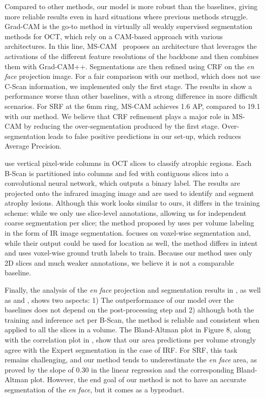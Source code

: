 Compared to other methods, our model is more robust than the baselines, giving more reliable results even in hard situations where previous methods struggle. Grad-CAM is the go-to method in virtually all weakly supervised segmentation methods for OCT, which rely on a CAM-based approach with various architectures. In this line, MS-CAM~ proposes an architecture that leverages the activations of the different feature resolutions of the backbone and then combines them with Grad-CAM++. Segmentations are then refined using CRF on the \textit{en face} projection image. For a fair comparison with our method, which does not use C-Scan information, we implemented only the first stage. The results in  show a performance worse than other baselines, with a strong difference in more difficult scenarios. For SRF at the 6mm ring, MS-CAM achieves 1.6 AP, compared to 19.1 with our method. We believe that CRF refinement plays a major role in MS-CAM by reducing the over-segmentation produced by the first stage. Over-segmentation leads to false positive predictions in our set-up, which reduces Average Precision.

 use vertical pixel-wide columns in OCT slices to classify atrophic regions. Each B-Scan is partitioned into columns and fed with contiguous slices into a convolutional neural network, which outputs a binary label. The results are projected onto the infrared imaging image and are used to identify and segment atrophy lesions. Although this work looks similar to ours, it differs in the training scheme: while we only use slice-level annotations, allowing us for independent coarse segmentation per slice; the method proposed by  uses per volume labeling in the form of IR image segmentation.
 focuses on voxel-wise segmentation and, while their output could be used for location as well, the method differs in intent and uses voxel-wise ground truth labels to train. Because our method uses only 2D slices and much weaker annotations, we believe it is not a comparable baseline.

Finally, the analysis of the \textit{en face} projection and segmentation results in , as well as  and , shows two aspects: 1) The outperformance of our model over the baselines does not depend on the post-processing step and 2) although both the training and inference act per B-Scan, the method is reliable and consistent when applied to all the slices in a volume. The Bland-Altman plot in Figure 8, along with the correlation plot in , show that our area predictions per volume strongly agree with the Expert segmentation in the case of IRF. For SRF, this task remains challenging, and our method tends to underestimate the \textit{en face} area, as proved by the slope of 0.30 in the linear regression and the corresponding Bland-Altman plot. However, the end goal of our method is not to have an accurate segmentation of the \textit{en face}, but it comes as a byproduct.

